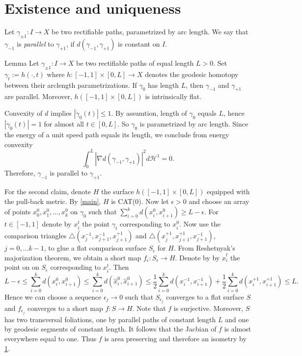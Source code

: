 \documentclass[a4paper,10pt]{amsart}
\begin{document}
\qeds











\section{Existence and uniqueness}

Let $\gamma_{\pm 1}:I\to X$ be two rectifiable paths, parametrized by arc length. We say that  $\gamma_{-1}$ is {\em parallel} to $\gamma_{+1}$, if $d(\gamma_{-1},\gamma_{+1})$
is constant on $I$.


\begin{thm}{Lemma}
Let $\gamma_{\pm 1}:I\to X$ be two rectifiable paths of equal length $L>0$. Set $\gamma_t:=h(\cdot,t)$ where $h:[-1,1]\times[0,L]\to X$ denotes the geodesic homotopy
between their arclength parametrizations. If $\gamma_0$ has length $L$, then $\gamma_{-1}$ and $\gamma_{+1}$ are parallel. Moreover, $h([-1,1]\times[0,L])$ is intrinsically 
flat.
\end{thm}
Convexity of $d$ implies $|\dot\gamma_0(t)|\leq 1$. By assumtion, length of $\gamma_0$ equals $L$, hence $|\dot\gamma_0(t)|=1$ for almost all $t\in[0,L]$. So $\gamma_0$
is parametrized by arc length. Since the energy of a unit speed path equals its length, we conclude from energy convexity 
$$
\int_0^L|\nabla d(\gamma_{-1},\gamma_{+1})|^2 d\mathcal{H}^1=0.
$$
Therefore, $\gamma_{-1}$ is parallel to $\gamma_{+1}$.

For the second claim, denote $H$ the surface $h([-1,1]\times[0,L])$ equipped with the pull-back metric. By \ref{main}, $H$
is CAT(0).
Now let $\epsilon>0$ and choose an array of points $x_0^{0},x_1^{0},\ldots,x_k^{0}$ on $\gamma_{0}$ 
such that $\sum_{i=0}^k d(x_i^{0},x_{i+1}^{0})\geq L-\epsilon$. For $t\in[-1,1]$ denote by $x_i^{t}$ the
point $\gamma_t$ corresponding to $x_i^{0}$. Now use the comparison triangles
$\triangle(x_{j}^{-1},x_{j+1}^{-1},x_{j+1}^{+1})$ and $\triangle(x_{j}^{+1},x_{j+1}^{+1},x_{j+1}^{-1})$, $j=0,\ldots k-1$,
to glue a flat comparison surface $S_\epsilon$ for $H$. From Reshetnyak's majorization theorem, we obtain a short map 
$f_\epsilon:S_\epsilon\to H$. Denote by by $\hat x_i^{t}$ the point on on $S_\epsilon$ corresponding to $x_i^{t}$. Then
$$
L-\epsilon\leq\sum_{i=0}^k d(x_i^{0},x_{i+1}^{0})\leq\sum_{i=0}^k d(\hat x_i^{0},\hat x_{i+1}^{0})\leq
\frac{1}{2}\sum_{i=0}^k d(x_i^{-1}, x_{i+1}^{-1})+\frac{1}{2}\sum_{i=0}^k d(x_i^{+1}, x_{i+1}^{+1})\leq L.
$$
Hence we can choose a sequence $\epsilon_j\to 0$ such that $S_{\epsilon_j}$ converges to a flat surface $S$ and $f_{\epsilon_j}$
converges to a short map $f:S\to H$. Note that $f$ is surjective. Moreover, $S$
has two transversal foliations, one by parallel paths of constant length $L$ and one by geodesic segments of constant length.
It follows that the Jacbian of $f$ is almost everywhere equal to one. Thus $f$ is area preserving and therefore an isometry by \ref{}.
\qeds
\end{document}
